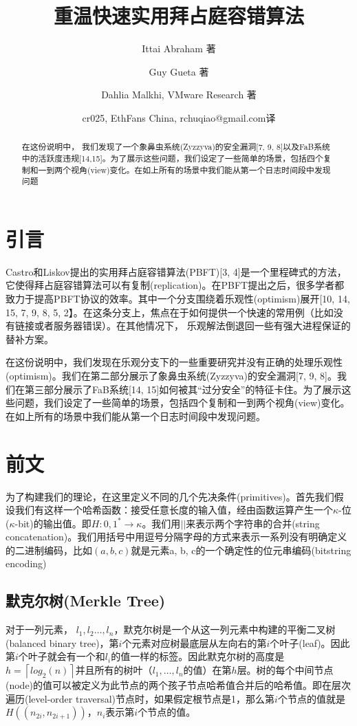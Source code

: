 \documentclass[UTF8]{ctexart}
\title{重温快速实用拜占庭容错算法}
\author{Ittai Abraham 著 \and Guy Gueta 著 \and Dahlia Malkhi, VMware Research 著 \and cr025, EthFans China, rchuqiao@gmail.com译}
\def\lc{\left\lceil}
\def\rc{\right\rceil}
\begin{document}
\maketitle

\begin{abstract}
在这份说明中， 我们发现了一个象鼻虫系统(Zyzzyva)的安全漏洞[7, 9, 8]以及FaB系统中的活跃度违规[14,15]。为了展示这些问题，我们设定了一些简单的场景，包括四个复制和一到两个视角(view)变化。在如上所有的场景中我们能从第一个日志时间段中发现问题
\end{abstract}

\section{引言}
Castro和Liskov提出的实用拜占庭容错算法(PBFT)[3, 4]是一个里程碑式的方法，它使得拜占庭容错算法可以有复制(replication)。在PBFT提出之后，很多学者都致力于提高PBFT协议的效率。其中一个分支围绕着乐观性(optimism)展开[10, 14, 15, 7, 9, 8, 5, 2】。在这条分支上，焦点在于如何提供一个快速的常用例（比如没有链接或者服务器错误）。在其他情况下， 乐观解法倒退回一些有强大进程保证的替补方案。

在这份说明中，我们发现在乐观分支下的一些重要研究并没有正确的处理乐观性(optimism)。我们在第二部分展示了象鼻虫系统(Zyzzyva)的安全漏洞[7, 9, 8]。我们在第三部分展示了FaB系统[14, 15]如何被其“过分安全”的特征卡住。为了展示这些问题，我们设定了一些简单的场景，包括四个复制和一到两个视角(view)变化。在如上所有的场景中我们能从第一个日志时间段中发现问题。














\section{前文} \label{sec:firstpage}

为了构建我们的理论，在这里定义不同的几个先决条件(primitives)。首先我们假设我们有这样一个哈希函数：接受任意长度的输入值，经由函数运算产生一个$\kappa$-位($\kappa$-bit)的输出值。即$H: {0, 1}^* \to \kappa$。我们用$||$来表示两个字符串的合并(string concatenation)。我们用括号中用逗号分隔字母的方式来表示一系列没有明确定义的二进制编码，比如$(a, b, c)$就是元素a, b, c的一个确定性的位元串编码(bitstring encoding)

\subsection{默克尔树(Merkle Tree)}
对于一列元素， $l_1, l_2 \dots, l_n$，默克尔树是一个从这一列元素中构建的平衡二叉树(balanced binary tree)，第$i$个元素对应树最底层从左向右的第$i$个叶子(leaf)。因此第$i$个叶子就会有一个和$l_i$的值一样的标签。因此默克尔树的高度是$h = \lc log_2(n)\rc$并且所有的树叶（$l_1, \dots, l_n$的值）在第$h$层。树的每个中间节点(node)的值可以被定义为此节点的两个孩子节点哈希值合并后的哈希值。即在层次遍历(level-order traversal)节点时，如果假定根节点是1，那么第$i$个节点的值就是$H((n_{2i}, n_{2i + 1}))$，$n_i$表示第$i$个节点的值。
\end{document}
